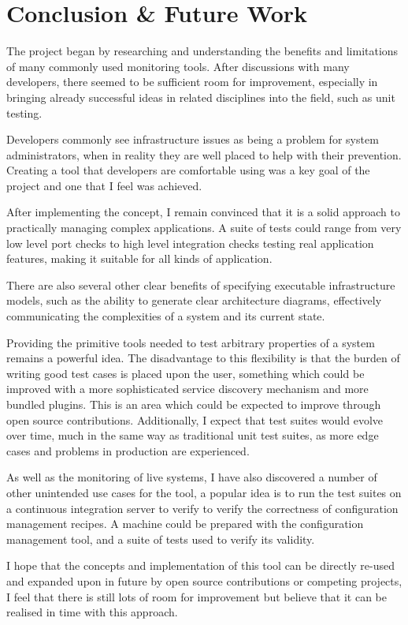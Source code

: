 \documentclass{cshonours}
\begin{document}
\chapter{Conclusion \& Future Work}

The project began by researching and understanding the benefits and limitations of many commonly used monitoring tools. After discussions with many developers, there seemed to be sufficient room for improvement, especially in bringing already successful ideas in related disciplines into the field, such as unit testing.

Developers commonly see infrastructure issues as being a problem for system administrators, when in reality they are well placed to help with their prevention. Creating a tool that developers are comfortable using was a key goal of the project and one that I feel was achieved.

After implementing the concept, I remain convinced that it is a solid approach to practically managing complex applications. A suite of tests could range from very low level port checks to high level integration checks testing real application features, making it suitable for all kinds of application.

There are also several other clear benefits of specifying executable infrastructure models, such as the ability to generate clear architecture diagrams, effectively communicating the complexities of a system and its current state.

Providing the primitive tools needed to test arbitrary properties of a system remains a powerful idea. The disadvantage to this flexibility is that the burden of writing good test cases is placed upon the user, something which could be improved with a more sophisticated service discovery mechanism and more bundled plugins. This is an area which could be expected to improve through open source contributions. Additionally, I expect that test suites would evolve over time, much in the same way as traditional unit test suites, as more edge cases and problems in production are experienced.

As well as the monitoring of live systems, I have also discovered a number of other unintended use cases for the tool, a popular idea is to run the test suites on a continuous integration server to verify to verify the correctness of configuration management recipes. A machine could be prepared with the configuration management tool, and a suite of tests used to verify its validity.

I hope that the concepts and implementation of this tool can be directly re-used and expanded upon in future by open source contributions or competing projects, I feel that there is still lots of room for improvement but believe that it can be realised in time with this approach.
\end{document}
